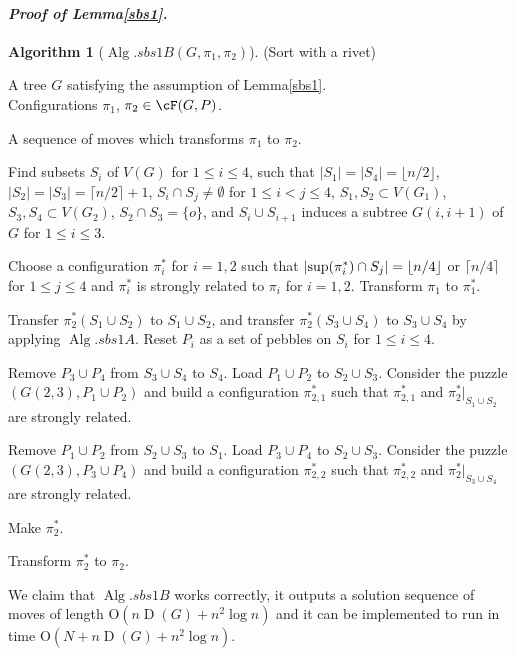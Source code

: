 \documentclass[letter,11pt]{article}
\newcommand{\white}{\qquad{\framebox{\rule{0pt}{4pt}}}}
\newcommand{\owari}{\hfill\white}
\theoremstyle{definition}
\theoremstyle{definition}
\newtheorem{alg}{Algorithm}
\DeclareMathOperator{\Alg}{Alg}
\DeclareMathOperator{\D}{D}
\newcommand{\1}{\boldmath$~1~$\unboldmath}
\newcommand{\Ord}{\mathrm{O}}
\newcommand{\qedgo}{\vspace{0.35cm}}
\newcommand{\tume}{\hspace*{0.2em}}
\newcommand{\maru}[1]{{\ooalign{\hfill$\small#1$\hfill\crcr\scalebox{1.3}{$\bigcirc$}}}}
\newenvironment{alg-enumerate}{%
  \begin{enumerate}%
   \renewcommand{\theenumi}{\arabic{enumi}}%
   \renewcommand{\labelenumi}{\rm{{\maru{\theenumi}}\tume\/}}%
   \renewcommand{\labelenumii}{\rm{$(${\maru{\theenumi}}-\theenumii$)$\tume\/}}%
 }{\end{enumerate}%
}
\newenvironment{Proofof}[1]{\expandafter
\paragraph{{\it Proof of #1.}}}{\hspace{5mm}\owari\qedgo}
\newcommand{\namelistlabel}[1]{\hspace*{10pt}\mbox{#1}:\hspace{\fill}}
\newenvironment{namelist}[1]{%
    \begin{list}{}
      {\let\makelabel\namelistlabel
      \settowidth{\labelwidth}{#1}
      \setlength{\leftmargin}{1.1\labelwidth}
      \setlength{\labelsep}{5pt}
      \setlength{\parsep}{0pt}}
  }{%
  \end{list}}
\begin{document}
\begin{Proofof}{Lemma\tume\ref{sbs1}}
\begin{alg}[$\Alg.sbs1B(G, \pi_1, \pi_2)$](Sort with a rivet)\hfill
\begin{namelist}{OUTPUT}
\item[\sl Input]{A tree $G$ satisfying the assumption of Lemma\tume\ref{sbs1}.\\
Configurations $\pi_1$, $\pi_2 \in \cF(G, P)$.
}
\item[\sl Output]{A sequence of moves which transforms $\pi_1$ to $\pi_2$.}
\end{namelist}
\begin{alg-enumerate}
\item Find subsets $S_i$ of $V(G)$ for $1 \le i \le 4$, such that $|S_1| = |S_4| = \lfloor n/2 \rfloor$, $|S_2| = |S_3| = \lceil n/2 \rceil + 1$, $S_i \cap S_j \ne \emptyset$ for $1 \le i < j \le 4$, $S_1, S_2 \subset V(G_1)$, $S_3, S_4 \subset V(G_2)$, $S_2 \cap S_3 = \{ o \}$, and $S_i \cup S_{i+1}$ induces a subtree $G(i, i+1)$ of $G$ for $1 \le i \le 3$. 
\item Choose a configuration $\pi_i^{\ast}$ for $i = 1, 2$ such that $|{\rm sup}(\pi_i^{\ast}) \cap S_j| = \lfloor n/4 \rfloor$ or $\lceil n/4 \rceil$ for $1 \le j \le 4$ and $\pi_i^{\ast}$ is strongly related to $\pi_i$ for $i = 1, 2$.
Transform $\pi_1$ to $\pi_1^{\ast}$.
\item Transfer $\pi_2^{\ast}(S_1 \cup S_2)$ to $S_1 \cup S_2$, and transfer $\pi_2^{\ast}(S_3 \cup S_4)$ to $S_3 \cup S_4$ by applying $\Alg.sbs1A$.
Reset $P_i$ as a set of pebbles on $S_i$ for $1 \le i \le 4$.
\item Remove $P_3 \cup P_4$ from $S_3 \cup S_4$ to $S_4$.
Load $P_1 \cup P_2$ to $S_2 \cup S_3$.
Consider the puzzle $(G(2,3), P_1 \cup P_2)$ and build a configuration $\pi_{2,1}^{\ast}$
such that $\pi_{2,1}^{\ast}$ and $\pi_2^{\ast}|_{S_1 \cup S_2}$ are strongly related.
\item Remove $P_1 \cup P_2$ from $S_2 \cup S_3$ to $S_1$.
Load $P_3 \cup P_4$ to $S_2 \cup S_3$.
Consider the puzzle $(G(2,3), P_3 \cup P_4)$ and build a configuration $\pi_{2,2}^{\ast}$ 
such that $\pi_{2,2}^{\ast}$ and $\pi_2^{\ast}|_{S_3 \cup S_4}$ are strongly related.
\item Make $\pi_2^{\ast}$.
\item Transform $\pi_2^{\ast}$ to $\pi_2$.
\end{alg-enumerate}
\end{alg}

We claim that $\Alg.sbs1B$ works correctly, it outputs a solution sequence of moves of length $\Ord (n\D(G) + n^2 \log n) $ and it can be implemented to run in time $\Ord (N + n\D(G) + n^2 \log n)$.


\end{Proofof}
\end{document}
